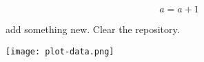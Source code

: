\usepackage{graphicx}

$$    a = a + 1 $$

add something new. 
Clear the repository.



\texttt{[image: plot-data.png]}

